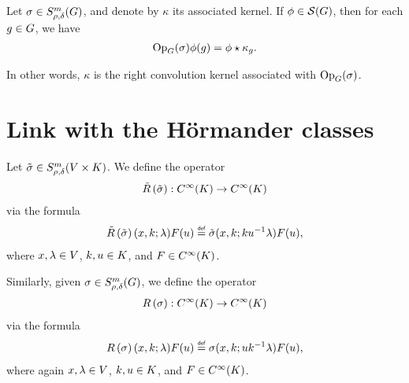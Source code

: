 \begin{proposition}[Quantisation]
    Let $\sigma \in \SymbolClass{m}{\rho, \delta}$,
    and denote by $\kappa$ its associated kernel.
    If $\phi \in \Schwartz\Group$, then for each $g \in \Group$, we have
    \begin{align*}
        \Op(\sigma) \phi(g) = \conv{\phi}{\kappa_g}.
    \end{align*}

    In other words, $\kappa$ is the right convolution kernel associated with $\Op(\sigma)$.
\end{proposition}

\section{Link with the H\"ormander classes}

\begin{definition}
    Let $\tilde \sigma \in \SymbolClass[\GroupDirect]{m}{\rho, \delta}$.
    We define the operator
    \begin{align*}
        \Rotation {\tilde \sigma} : \SmoothFunctions \CompactGroup \to \SmoothFunctions \CompactGroup
    \end{align*}
    via the formula
    \begin{align*}
        \Rotation {\tilde \sigma}(x, k; \lambda) F(u) \defeq \tilde \sigma(x, k; k u^{-1} \lambda) F(u),
    \end{align*}
    where $x, \lambda \in \VectorSpace$, $k, u \in \CompactGroup$, and $F \in \SmoothFunctions \CompactGroup$.

    Similarly, given $\sigma \in \SymbolClass m {\rho, \delta}$,
    we define the operator
    \begin{align*}
        \InverseRotation \sigma : \SmoothFunctions \CompactGroup \to \SmoothFunctions \CompactGroup
    \end{align*}
    via the formula
    \begin{align*}
        \InverseRotation \sigma (x, k; \lambda) F(u) \defeq \sigma(x, k; u k^{-1} \lambda) F(u),
    \end{align*}
    where again $x, \lambda \in \VectorSpace$, $k, u \in \CompactGroup$, and $F \in \SmoothFunctions \CompactGroup$.
\end{definition}

